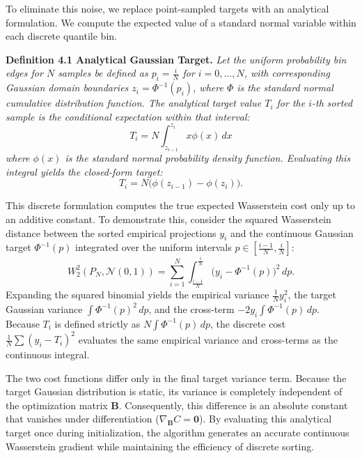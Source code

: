 \documentclass[12pt,a4paper,twoside,openany]{book}
\begin{document}
To eliminate this noise, we replace point-sampled targets with an analytical formulation. 
We compute the expected value of a standard normal variable within each discrete quantile bin.

\vspace{0.5em}
\noindent\textbf{Definition 4.1 Analytical Gaussian Target.} \textit{Let the uniform probability bin edges for $N$ samples be 
defined as $p_i = \frac{i}{N}$ for $i = 0, \dots, N$, with corresponding Gaussian domain boundaries $z_i = \Phi^{-1}(p_i)$, where $\Phi$ is 
the standard normal cumulative distribution function. The analytical target value $T_i$ for the $i$-th sorted 
sample is the conditional expectation within that interval:}
\begin{equation}
    T_i = N \int_{z_{i-1}}^{z_i} x \phi(x) \, dx
\end{equation}
\textit{where $\phi(x)$ is the standard normal probability density function. Evaluating this integral yields the closed-form target:}
\begin{equation}
    T_i = N \big( \phi(z_{i-1}) - \phi(z_i) \big).
\end{equation}
\vspace{0.5em}

This discrete formulation computes the true expected Wasserstein cost only up to an additive constant. 
To demonstrate this, consider the squared Wasserstein distance between the sorted empirical projections $y_i$ and 
the continuous Gaussian target $\Phi^{-1}(p)$ integrated over the uniform intervals $p \in [\frac{i-1}{N}, \frac{i}{N}]$:
\begin{equation}
    W_2^2(P_N, \mathcal{N}(0,1)) = \sum_{i=1}^N \int_{\frac{i-1}{N}}^{\frac{i}{N}} \big( y_i - \Phi^{-1}(p) \big)^2 \, dp.
\end{equation}
Expanding the squared binomial yields the empirical variance $\frac{1}{N}y_i^2$, the target Gaussian variance $\int \Phi^{-1}(p)^2 \, dp$, 
and the cross-term $-2y_i \int \Phi^{-1}(p) \, dp$. Because $T_i$ is defined strictly as $N \int \Phi^{-1}(p) \, dp$, 
the discrete cost $\frac{1}{N}\sum (y_i - T_i)^2$ evaluates the same empirical variance and cross-terms as the continuous integral. 

The two cost functions differ only in the final target variance term. Because the target Gaussian distribution is static, 
its variance is completely independent of the optimization matrix $\mathbf{B}$. Consequently, this difference is an absolute constant 
that vanishes under differentiation ($\nabla_{\mathbf{B}} C = \mathbf{0}$). By evaluating this analytical target once during initialization, 
the algorithm generates an accurate continuous Wasserstein gradient while maintaining the efficiency of discrete sorting.
\end{document}
